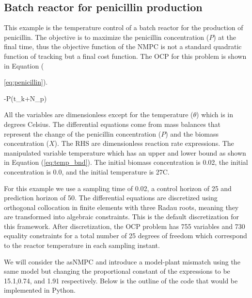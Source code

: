 \documentclass{article}
\begin{document}
\subsection{Batch reactor for penicillin production}
This example is the temperature control of a batch reactor for the production of penicillin.
The objective is to maximize the penicillin concentration ($P$) at the final time, thus the objective function of the NMPC is not a standard quadratic function of tracking but a final cost function.
The OCP for this problem is shown in Equation ({\ref{eq:penicillin}).
\begin{mini!}
	{}{-P(t_k+\tau N_p)}{\label{eq:penicillin}}{}
\end{mini!}
All the variables are dimensionless except for the temperature ($\theta$) which is in degrees Celsius.
The differential equations come from mass balances that represent the change of the penicillin concentration ($P$) and the biomass concentration ($X$).
The RHS are dimensionless reaction rate expressions.
The manipulated variable temperature which has an upper and lower bound as shown in Equation (\ref{eq:temp_bnd}).
The initial biomass concentration is 0.02, the initial concentration is 0.0, and the initial temperature is 27\degree C.
\par
For this example we use a sampling time of 0.02, a control horizon of 25 and prediction horizon of 50.
The differential equations are discretized using orthogonal collocation in finite elements with three Radau roots, meaning they are transformed into algebraic constraints.
This is the default discretization for this framework.
After discretization, the OCP problem has 755 variables and 730 equality constraints for a total number of 25 degrees of freedom which correspond to the reactor temperature in each sampling instant.
\par
We will consider the asNMPC and introduce a model-plant mismatch using the same model but changing the proportional constant of the expressions to be 15.1,0.74, and 1.91 respectively.
Below is the outline of the code that would be implemented in Python.

}
\end{document}
